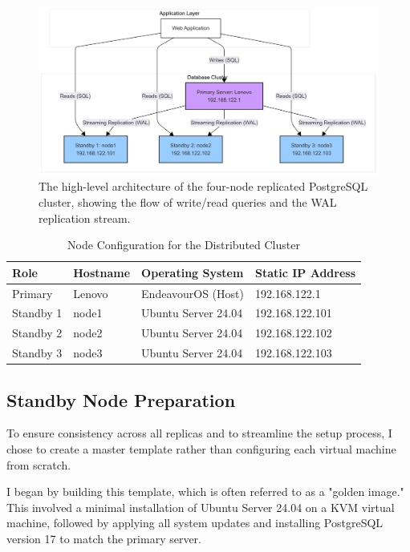 \documentclass[conference]{IEEEtran}
\begin{document}
\begin{figure}[!h]
    \centering
    \includegraphics[width=0.9\columnwidth]{./images/architecture-diagram.png}
    \caption{The high-level architecture of the four-node replicated PostgreSQL cluster, showing the flow of write/read queries and the WAL replication stream.}
    \label{fig:architecture}
\end{figure}

\begin{table}[h!]
\centering
\caption{Node Configuration for the Distributed Cluster}
\label{tab:node_config}
\begin{tabular}{l l l l}
\toprule
\textbf{Role} & \textbf{Hostname} & \textbf{Operating System} & \textbf{Static IP Address} \\
\midrule
Primary   & Lenovo & EndeavourOS (Host) & 192.168.122.1 \\
Standby 1 & node1             & Ubuntu Server 24.04  & 192.168.122.101 \\
Standby 2 & node2             & Ubuntu Server 24.04  & 192.168.122.102 \\
Standby 3 & node3             & Ubuntu Server 24.04  & 192.168.122.103 \\
\bottomrule
\end{tabular}
\end{table}

\subsection{Standby Node Preparation}

To ensure consistency across all replicas and to streamline the setup process, I chose to create a master template rather than configuring each virtual machine from scratch.

I began by building this template, which is often referred to as a "golden image." This involved a minimal installation of Ubuntu Server 24.04 on a KVM virtual machine, followed by applying all system updates and installing PostgreSQL version 17 to match the primary server.
\end{document}
